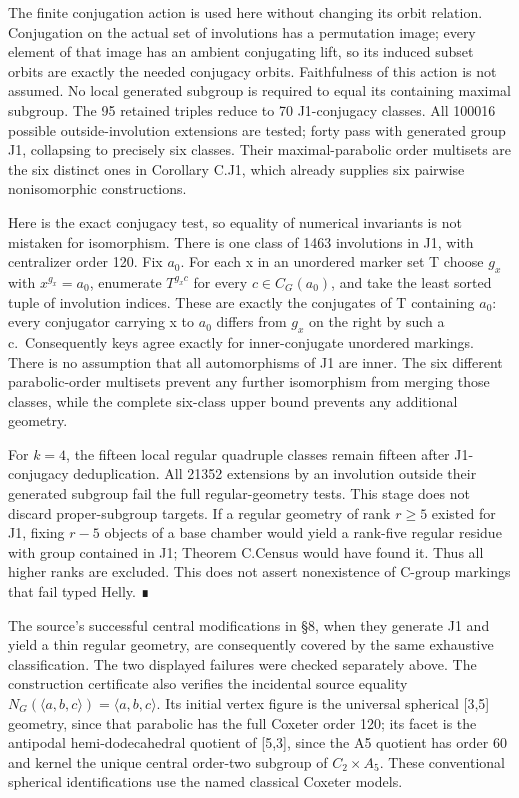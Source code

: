 \documentclass[
  11pt,
  a4paper,
]{article}
\newcounter{none} %
\begin{document}
The finite conjugation action is used here without changing its orbit
relation. Conjugation on the actual set of involutions has a permutation
image; every element of that image has an ambient conjugating lift, so
its induced subset orbits are exactly the needed conjugacy orbits.
Faithfulness of this action is not assumed. No local generated subgroup
is required to equal its containing maximal subgroup. The 95 retained
triples reduce to 70 J1-conjugacy classes. All 100016 possible
outside-involution extensions are tested; forty pass with generated
group J1, collapsing to precisely six classes. Their maximal-parabolic
order multisets are the six distinct ones in Corollary C.J1, which
already supplies six pairwise nonisomorphic constructions.

Here is the exact conjugacy test, so equality of numerical invariants is
not mistaken for isomorphism. There is one class of 1463 involutions in
J1, with centralizer order 120. Fix \(a_{0}\). For each x in an
unordered marker set T choose \(g_x\) with \(x^{g_x}=a_{0}\), enumerate
\(T^{g_xc}\) for every \(c\in C_G(a_{0})\), and take the least sorted
tuple of involution indices. These are exactly the conjugates of T
containing \(a_{0}\): every conjugator carrying x to \(a_{0}\) differs
from \(g_x\) on the right by such a c.~Consequently keys agree exactly
for inner-conjugate unordered markings. There is no assumption that all
automorphisms of J1 are inner. The six different parabolic-order
multisets prevent any further isomorphism from merging those classes,
while the complete six-class upper bound prevents any additional
geometry.

For \(k=4\), the fifteen local regular quadruple classes remain fifteen
after J1-conjugacy deduplication. All 21352 extensions by an involution
outside their generated subgroup fail the full regular-geometry tests.
This stage does not discard proper-subgroup targets. If a regular
geometry of rank \(r\ge 5\) existed for J1, fixing \(r-5\) objects of a
base chamber would yield a rank-five regular residue with group
contained in J1; Theorem C.Census would have found it. Thus all higher
ranks are excluded. This does not assert nonexistence of C-group
markings that fail typed Helly. ∎

The source's successful central modifications in §8, when they generate
J1 and yield a thin regular geometry, are consequently covered by the
same exhaustive classification. The two displayed failures were checked
separately above. The construction certificate also verifies the
incidental source equality
\(N_G(\langle a,b,c\rangle )=\langle a,b,c\rangle\). Its initial vertex
figure is the universal spherical {[}3,5{]} geometry, since that
parabolic has the full Coxeter order 120; its facet is the antipodal
hemi-dodecahedral quotient of {[}5,3{]}, since the A5 quotient has order
60 and kernel the unique central order-two subgroup of
\(C_{2}\times A_{5}\). These conventional spherical identifications use
the named classical Coxeter models.
\end{document}
